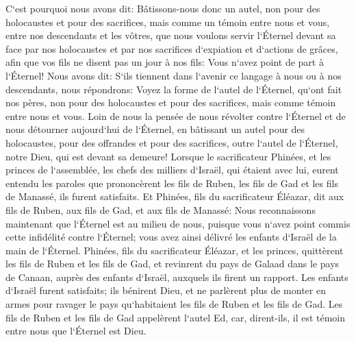 \verse C`est pourquoi nous avons dit: Bâtissons-nous donc un autel, non pour des holocaustes et pour des sacrifices, 
\verse mais comme un témoin entre nous et vous, entre nos descendants et les vôtres, que nous voulons servir l`Éternel devant sa face par nos holocaustes et par nos sacrifices d`expiation et d`actions de grâces, afin que vos fils ne disent pas un jour à nos fils: Vous n`avez point de part à l`Éternel! 
\verse Nous avons dit: S`ils tiennent dans l`avenir ce langage à nous ou à nos descendants, nous répondrons: Voyez la forme de l`autel de l`Éternel, qu`ont fait nos pères, non pour des holocaustes et pour des sacrifices, mais comme témoin entre nous et vous. 
\verse Loin de nous la pensée de nous révolter contre l`Éternel et de nous détourner aujourd`hui de l`Éternel, en bâtissant un autel pour des holocaustes, pour des offrandes et pour des sacrifices, outre l`autel de l`Éternel, notre Dieu, qui est devant sa demeure! 
\verse Lorsque le sacrificateur Phinées, et les princes de l`assemblée, les chefs des milliers d`Israël, qui étaient avec lui, eurent entendu les paroles que prononcèrent les fils de Ruben, les fils de Gad et les fils de Manassé, ils furent satisfaits. 
\verse Et Phinées, fils du sacrificateur Éléazar, dit aux fils de Ruben, aux fils de Gad, et aux fils de Manassé: Nous reconnaissons maintenant que l`Éternel est au milieu de nous, puisque vous n`avez point commis cette infidélité contre l`Éternel; vous avez ainsi délivré les enfants d`Israël de la main de l`Éternel. 
\verse Phinées, fils du sacrificateur Éléazar, et les princes, quittèrent les fils de Ruben et les fils de Gad, et revinrent du pays de Galaad dans le pays de Canaan, auprès des enfants d`Israël, auxquels ils firent un rapport. 
\verse Les enfants d`Israël furent satisfaits; ils bénirent Dieu, et ne parlèrent plus de monter en armes pour ravager le pays qu`habitaient les fils de Ruben et les fils de Gad. 
\verse Les fils de Ruben et les fils de Gad appelèrent l`autel Ed, car, dirent-ils, il est témoin entre nous que l`Éternel est Dieu. 

\chapter{}

